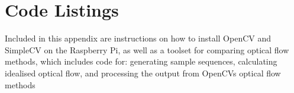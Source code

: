 \chapter{Code Listings}
\label{sec:appendix}

\singlespacing

Included in this appendix are instructions on how to install OpenCV and SimpleCV on the Raspberry Pi, as well as a toolset for comparing optical flow methods, which includes code for: generating sample sequences, calculating idealised optical flow, and processing the output from OpenCVs optical flow methods


\clearpage

%

%
%

%
%

%
%

%
%


\clearpage

\clearpage


\clearpage

\clearpage

%
%
\onehalfspacing
